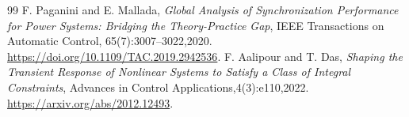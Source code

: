 \documentclass[11pt]{article}
\begin{document}
\begin{thebibliography}{99}
 F. Paganini and E. Mallada,
\emph{Global Analysis of Synchronization Performance for Power Systems:
Bridging the Theory-Practice Gap}, IEEE Transactions on Automatic Control,
65(7):3007--3022,2020. \url{https://doi.org/10.1109/TAC.2019.2942536}.
 F. Aalipour and T. Das,
\emph{Shaping the Transient Response of Nonlinear Systems to Satisfy a Class
of Integral Constraints}, Advances in Control Applications,4(3):e110,2022.
\url{https://arxiv.org/abs/2012.12493}.

\end{thebibliography}
\end{document}
